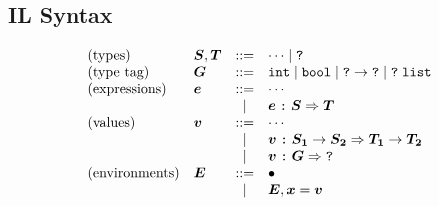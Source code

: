 \documentclass[11pt]{jarticle}
\def\mv#1{\mbox{\boldmath $#1$}}
\begin{document}
\subsection{IL Syntax}
\[
  \begin{array}{llcl}
    \mbox{(types)} & \mv{S}, \mv{T} & ::= & \cdots \mid \dyn \\
    \mbox{(type tag)} & \mv{G} & ::= & \nat \mid \bool \mid \dyn\imp \dyn \mid \dyn\; \listty \\
    \mbox{(expressions)} & \mv{e} & ::= & \cdots \\
    && | & \cast{\mv{e}}{\mv{S}}{\mv{T}} \\
    \mbox{(values)} & \mv{v} & ::= & \cdots \\
    && | & \cast{\mv{v}}{\mv{S_1} \imp \mv{S_2}}{\mv{T_1} \imp \mv{T_2}} \\
    && | & \cast{\mv{v}}{\mv{G}}{\dyn} \\
\mbox{(environments)}    
    &\mv{E}& ::= & \bullet \\ && | & \mv{E}, \mv{x} = \mv{v}
\end{array}
\]
\end{document}
